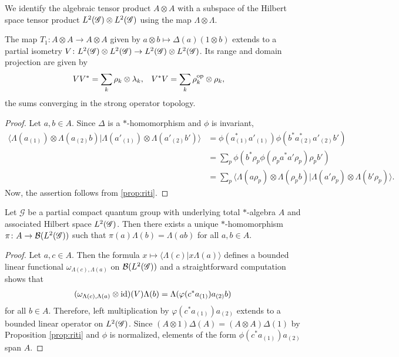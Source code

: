 We identify  the algebraic
tensor product $A\otimes A$ with a subspace of the Hilbert space
tensor product $L^{2}(\mathscr{G}) \otimes L^{2}(\mathscr{G})$ using the map $\Lambda \otimes \Lambda$.
\begin{Lem} \label{lemma:partial-isometry}
The map $T_{1} \colon A \otimes A \to A \otimes A$ given by $a\otimes
b\mapsto \Delta(a)(1 \otimes b)$ extends to a partial isometry
  $V \colon L^{2}(\mathscr{G}) \otimes L^{2}(\mathscr{G}) \to L^{2}(\mathscr{G}) \otimes L^{2}(\mathscr{G})$. Its range and domain projection  are given by
  \begin{align*}
    VV^{*} &= \sum_{k} \rho_{k} \otimes \lambda_{k}, &
    V^{*}V &=\sum_{k} \rho^{\operatorname{\mathrm{op}}}_{k} \otimes \rho_{k}, 
  \end{align*}
 the sums converging in the strong operator topology.
\end{Lem}
\begin{proof}
  Let $a,b \in A$. Since $\Delta$ is a $*$-homomorphism and $\phi$ is
invariant,
  \begin{align*}
    \langle \Lambda(a_{(1)}) \otimes
    \Lambda(a_{(2)}b)|\Lambda(a'_{(1)}) \otimes
    \Lambda(a'_{(2)}b')\rangle &=
    \phi(a_{(1)}^{*}a'_{(1)})\phi(b^{*}a_{(2)}^{*}a'_{(2)}b') \\
    &= \sum_{p}
    \phi(b^{*}\rho_{p}\phi(\rho_{p}a^{*}a'\rho_{p})\rho_{p}b') \\
    & =\sum_{p} \langle\Lambda(a\rho_{p}) \otimes \Lambda(\rho_{p}b) |
    \Lambda(a'\rho_{p}) \otimes \Lambda(b'\rho_{p})\rangle.
  \end{align*}
  Now, the assertion follows from \ref{prop:riti}.
\end{proof}

\begin{Prop} \label{prop:gns} Let $\mathscr{G}$ be a partial compact quantum group with
  underlying total $*$-algebra $A$ and associated Hilbert
  space $L^{2}(\mathscr{G})$. Then there exists a unique $*$-homomorphism $\pi\colon
  A \to {\cal B}(L^{2}(\mathscr{G}))$ such that $\pi(a)\Lambda(b)=\Lambda(ab)$ for
  all $a,b\in A$.
\end{Prop}
\begin{proof} 
  Let $a,c \in A$. Then the formula $x \mapsto \langle
\Lambda(c) | x\Lambda(a)\rangle$ defines a bounded linear functional
  $\omega_{\Lambda(c),\Lambda(a)}$ on ${\cal B}(L^{2}(\mathscr{G}))$ and a
  straightforward computation shows that
  \begin{align*}
    (\omega_{\Lambda(c),\Lambda(a)}\otimes \operatorname{id})(V)\Lambda(b) =
    \Lambda(\varphi(c^*a_{(1)})a_{(2)}b)
  \end{align*}
  for all $b\in A$. Therefore, left multiplication by
  $\varphi(c^*a_{(1)})a_{(2)}$ extends to a bounded linear operator on $L^{2}(\mathscr{G})$.
 Since $(A\otimes 1)\Delta(A) = (A\otimes
  A)\Delta(1)$ by Proposition \ref{prop:riti} and $\phi$ is
  normalized,  elements of the form $\phi(c^{*}a_{(1)})a_{(2)}$ span $A$.
\end{proof}


